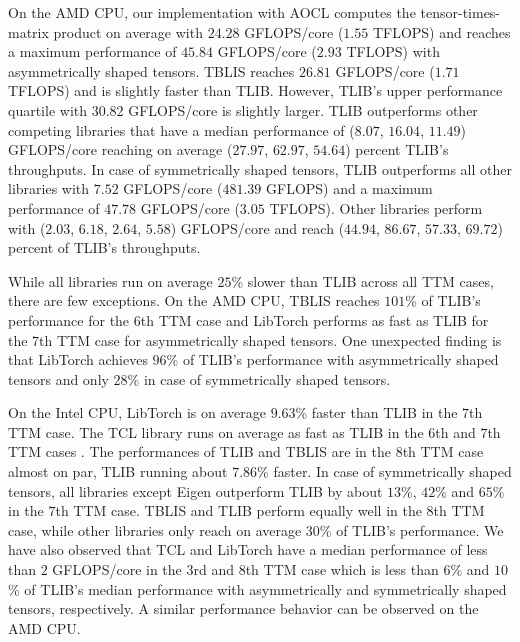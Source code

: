 On the AMD CPU, our implementation with AOCL computes the tensor-times-matrix product on average with $24.28$ GFLOPS/core ($1.55$ TFLOPS) and reaches a maximum performance of $45.84$ GFLOPS/core ($2.93$ TFLOPS) with asymmetrically shaped tensors.
TBLIS reaches $26.81$ GFLOPS/core ($1.71$ TFLOPS) and is slightly faster than TLIB. 
However, TLIB's upper performance quartile with $30.82$ GFLOPS/core is slightly larger. 
TLIB outperforms other competing libraries that have a median performance of ($8.07$, $16.04$, $11.49$) GFLOPS/core reaching on average ($27.97$, $62.97$, $54.64$) percent TLIB's throughputs.
In case of symmetrically shaped tensors, TLIB outperforms all other libraries with $7.52$ GFLOPS/core ($481.39$ GFLOPS) and a maximum performance of $47.78$ GFLOPS/core ($3.05$ TFLOPS).
Other libraries perform with ($2.03$, $6.18$, $2.64$, $5.58$) GFLOPS/core and reach ($44.94$, $86.67$, $57.33$, $69.72$) percent of TLIB's throughputs.

While all libraries run on average $25$\% slower than TLIB across all TTM cases, there are few exceptions.
On the AMD CPU, %
TBLIS reaches $101$\% of TLIB's performance for the $6$th TTM case and LibTorch performs as fast as TLIB for the $7$th TTM case for asymmetrically shaped tensors.
One unexpected finding is that LibTorch achieves $96$\% of TLIB's performance with asymmetrically shaped tensors and only $28$\% in case of symmetrically shaped tensors.

On the Intel CPU, LibTorch is on average $9.63$\% faster than TLIB in the $7$th TTM case.
The TCL library runs on average as fast as TLIB in the $6$th and $7$th TTM cases .
The performances of TLIB and TBLIS are in the $8$th TTM case almost on par, TLIB running about $7.86$\% faster.
In case of symmetrically shaped tensors, all libraries except Eigen outperform TLIB by about $13$\%, $42$\% and $65$\% in the $7$th TTM case.
TBLIS and TLIB perform equally well in the $8$th TTM case, while other libraries only reach on average $30$\% of TLIB's performance.
We have also observed that TCL and LibTorch have a median performance of less than $2$ GFLOPS/core in the $3$rd and $8$th TTM case which is less than $6$\% and $10$\% of TLIB's median performance with asymmetrically and symmetrically shaped tensors, respectively.
A similar performance behavior can be observed on the AMD CPU.

